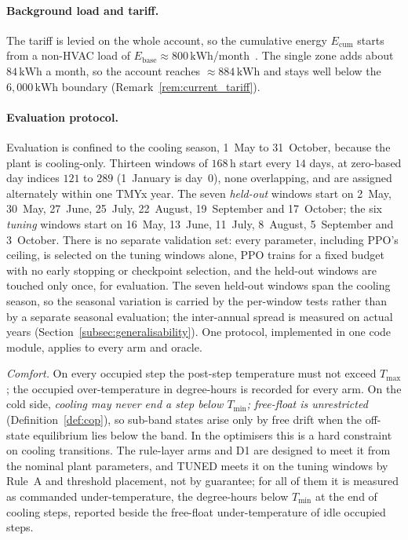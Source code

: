 \documentclass[3p,twocolumn,number]{elsarticle}
\newcommand{\Tmin}{T_{\min}}
\newcommand{\Tmax}{T_{\max}}
\newcommand{\kWh}{\text{kWh}}
\begin{document}
\paragraph{Background load and tariff.}
The tariff is levied on the whole account, so the cumulative energy $E_{\mathrm{cum}}$ starts from a non-HVAC load of $E_{\mathrm{base}}\approx800\,\kWh$/month~\cite{AlHomoud2021}. The single zone adds about $84\,\kWh$ a month, so the account reaches ${\approx}884\,\kWh$ and stays well below the $6{,}000\,\kWh$ boundary (Remark~\ref{rem:current_tariff}).

\paragraph{Evaluation protocol.}
\label{subsec:protocol}
Evaluation is confined to the cooling season, 1~May to 31~October, because the plant is cooling-only. Thirteen windows of $168\,$h start every $14$ days, at zero-based day indices $121$ to $289$ (1~January is day~$0$), none overlapping, and are assigned alternately within one TMYx year. The seven \emph{held-out} windows start on 2~May, 30~May, 27~June, 25~July, 22~August, 19~September and 17~October; the six \emph{tuning} windows start on 16~May, 13~June, 11~July, 8~August, 5~September and 3~October. There is no separate validation set: every parameter, including PPO's ceiling, is selected on the tuning windows alone, PPO trains for a fixed budget with no early stopping or checkpoint selection, and the held-out windows are touched only once, for evaluation. The seven held-out windows span the cooling season, so the seasonal variation is carried by the per-window tests rather than by a separate seasonal evaluation; the inter-annual spread is measured on actual years (Section~\ref{subsec:generalisability}). One protocol, implemented in one code module, applies to every arm and oracle.

\emph{Comfort.} On every occupied step the post-step temperature must not exceed $\Tmax$; the occupied over-temperature in degree-hours is recorded for every arm. On the cold side, \emph{cooling may never end a step below $\Tmin$; free-float is unrestricted} (Definition~\ref{def:cop}), so sub-band states arise only by free drift when the off-state equilibrium lies below the band. In the optimisers this is a hard constraint on cooling transitions. The rule-layer arms and D1 are designed to meet it from the nominal plant parameters, and TUNED meets it on the tuning windows by Rule~A and threshold placement, not by guarantee; for all of them it is measured as commanded under-temperature, the degree-hours below $\Tmin$ at the end of cooling steps, reported beside the free-float under-temperature of idle occupied steps.
\end{document}
